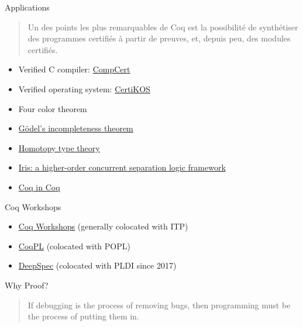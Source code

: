 \documentclass[usenames,xcolor=svgnames,11pt,sans,aspectratio=169]{beamer}
\begin{document}
\begin{frame}{Applications}
  \begin{quote}
    Un des points les plus remarquables de Coq est la possibilité de synthétiser des programmes certifiés à partir de preuves,
    et, depuis peu, des modules certifiés.

  \end{quote}
  \begin{itemize}
    \item<1-> Verified C compiler: \href{http://compcert.inria.fr}{CompCert}
    \item<2-> Verified operating system: \href{http://flint.cs.yale.edu/certikos/index.html}{CertiKOS}
    \item<3-> Four color theorem
    \item<4-> \href{http://r6.ca/Goedel/goedel1.html}{Gödel's incompleteness theorem}
    \item<5-> \href{https://github.com/HoTT/HoTT/}{Homotopy type theory}
    \item<6-> \href{https://iris-project.org}{Iris: a higher-order concurrent separation logic framework}
    \item<7-> \href{https://github.com/coq-contribs/coq-in-coq}{Coq in Coq}
  \end{itemize}
\end{frame}

\begin{frame}{Coq Workshops}
  \begin{itemize}
    \item \href{https://coq-workshop.gitlab.io}{Coq Workshops} (generally colocated with ITP)
    \item \href{https://coq.inria.fr/coqpl.html}{CoqPL} (colocated with POPL)
    \item \href{https://deepspec.org/page/Event/}{DeepSpec} (colocated with PLDI since 2017)
  \end{itemize}
\end{frame}

\begin{frame}{Why Proof?}
  \linespread{1.5}
  \begin{quote}
    If debugging is the process of removing bugs, then programming must be the process of putting them in.

  \end{quote}
\end{frame}
\end{document}
